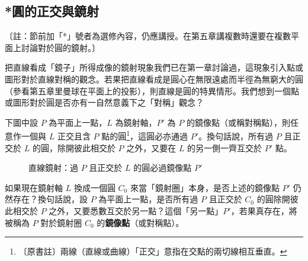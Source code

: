 \subsection{*圓的正交與鏡射}
\label{sec:b4s-3-6}

〔註：節前加「*」號者為選修內容，仍應講授。在第五章講複數時還要在複數平面上討論對於圓的鏡射。〕

把直線看成「鏡子」所得成像的鏡射現象我們已在第一章討論過，這現象引入點或圖形對於直線對稱的觀念。若果把直線看成是圓心在無限遠處而半徑為無窮大的圓（參看第五章里曼球在平面上的投影），則直線是圓的特異情形。我們想到一個點或圖形對於圓是否亦有一自然意義下之「對稱」觀念？

下圖中設 $P$ 為平面上一點，$L$ 為鏡射軸，$P'$ 為 $P$ 的鏡像點（或稱對稱點），則任意作一個與 $L$ 正交且含 $P$ 點的圓\label{note:b4s-ch3-ortho-def}\footnote{〔原書註〕兩線（直線或曲線）「正交」意指在交點的兩切線相互垂直。}，這圓必亦通過 $P'$。換句話說，所有過 $P$ 且正交於 $L$ 的圓，除開彼此相交於 $P$ 之外，又要在 $L$ 的另一側一齊互交於 $P'$ 點。

\begin{figure}[htbp]
\centering
{}
\caption{直線鏡射：過 $P$ 且正交於 $L$ 的圓必過鏡像點 $P'$}
\label{fig:b4s-3-37}
\end{figure}

如果現在鏡射軸 $L$ 換成一個圓 $C_0$ 來當「鏡射圈」本身，是否上述的鏡像點 $P'$ 仍然存在？換句話說，設 $P$ 為平面上一點，是否所有過 $P$ 且正交於 $C_0$ 的圓除開彼此相交於 $P$ 之外，又要悉數互交於另一點？這個「另一點」$P'$，若果真存在，將被稱為 $P$ 對於鏡射圈 $C_0$ 的\textbf{鏡像點}（或對稱點）。

